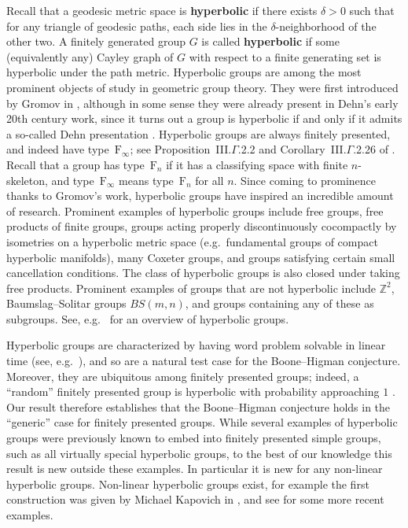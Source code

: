 \documentclass[11pt,letterpaper]{amsart}
\theoremstyle{definition}
\newcommand{\newword}[1]{\textbf{#1}}
\newcommand{\Z}{\mathbb{Z}}
\newcommand{\F}{\mathrm{F}}
\begin{document}
Recall that a geodesic metric space is \newword{hyperbolic} if there exists $\delta>0$ such that for any triangle of geodesic paths, each side lies in the $\delta$-neighborhood of the other two. A finitely generated group $G$ is called \newword{hyperbolic} if some (equivalently any) Cayley graph of $G$ with respect to a finite generating set is hyperbolic under the path metric. Hyperbolic groups are among the most prominent objects of study in geometric group theory. They were first introduced by Gromov in \cite{Gromov1987}, although in some sense they were already present in Dehn's early 20th century work, since it turns out a group is hyperbolic if and only if it admits a so-called Dehn presentation \cite[Theorem~III.$\Gamma$.2.6]{BrHa}. Hyperbolic groups are always finitely presented, and indeed have type~$\F_{\!\infty}$; see Proposition~III.$\Gamma$.2.2 and Corollary~III.$\Gamma$.2.26 of \cite{BrHa}. Recall that a group has type~$\F_n$ if it has a classifying space with finite $n$-skeleton, and type~$\F_{\!\infty}$ means type~$\F_n$ for all $n$. Since coming to prominence thanks to Gromov's work, hyperbolic groups have inspired an incredible amount of research. Prominent examples of hyperbolic groups include free groups, free products of finite groups, groups acting properly discontinuously cocompactly by isometries on a hyperbolic metric space (e.g.\ fundamental groups of compact hyperbolic manifolds), many Coxeter groups,  and groups satisfying certain small cancellation conditions. The class of hyperbolic groups is also closed under taking free products. Prominent examples of groups that are not hyperbolic include $\Z^2$, Baumslag--Solitar groups $BS(m,n)$, and groups containing any of these as subgroups. See, e.g.\ \cite[Chapter~III]{BrHa} for an overview of hyperbolic groups.

Hyperbolic groups are characterized by having word problem solvable in linear time (see, e.g.\ \cite[Section~III.$\Gamma$]{BrHa}), and so are a natural test case for the Boone--Higman conjecture. Moreover, they are ubiquitous among finitely presented groups; indeed, a ``random'' finitely presented group is hyperbolic with probability approaching $1$ \cite{Champetier,Ol'shanskiiYu,Gromov1993}. Our result therefore establishes that the Boone--Higman conjecture holds in the ``generic'' case for finitely presented groups. While several examples of hyperbolic groups were previously known to embed into finitely presented simple groups, such as all virtually special hyperbolic groups, to the best of our knowledge this result is new outside these examples. In particular it is new for any non-linear hyperbolic groups. Non-linear hyperbolic groups exist, for example the first construction was given by Michael Kapovich in \cite[Section~8]{kapovich05}, and see \cite{canary19} for some more recent examples.
\end{document}
